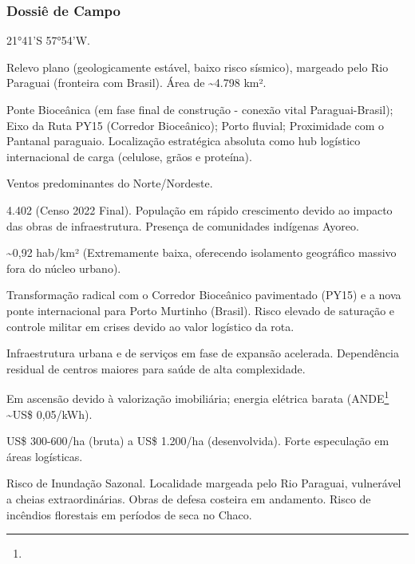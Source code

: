 \subsubsection{Dossiê de Campo}
\begin{description}[style=nextline,leftmargin=0.5cm,font=\bfseries]
\item[Coordenadas]  21°41'S 57°54'W.
\item[Topografia]  Relevo plano (geologicamente estável, baixo risco sísmico), margeado pelo Rio Paraguai (fronteira com Brasil). Área de \textasciitilde 4.798 km².
\item[Alvos Estratégicos]  Ponte Bioceânica (em fase final de construção - conexão vital Paraguai-Brasil); Eixo da Ruta PY15 (Corredor Bioceânico); Porto fluvial; Proximidade com o Pantanal paraguaio. Localização estratégica absoluta como hub logístico internacional de carga (celulose, grãos e proteína).
\item[Fallout]  Ventos predominantes do Norte/\allowbreak \allowbreak Nordeste.
\item[População]  4.402 (Censo 2022 Final). População em rápido crescimento devido ao impacto das obras de infraestrutura. Presença de comunidades indígenas Ayoreo.
\item[Densidade]  \textasciitilde 0,92 hab/\allowbreak \allowbreak km² (Extremamente baixa, oferecendo isolamento geográfico massivo fora do núcleo urbano).
\item[Vias de Acesso]  Transformação radical com o Corredor Bioceânico pavimentado (PY15) e a nova ponte internacional para Porto Murtinho (Brasil). Risco elevado de saturação e controle militar em crises devido ao valor logístico da rota.
\item[Serviços]  Infraestrutura urbana e de serviços em fase de expansão acelerada. Dependência residual de centros maiores para saúde de alta complexidade.
\item[Custo de Vida]  Em ascensão devido à valorização imobiliária; energia elétrica barata (ANDE\footnote{\fineANDE} \textasciitilde US\$ 0,05/\allowbreak \allowbreak kWh).
\item[Preço da Terra]  US\$ 300-600/\allowbreak \allowbreak ha (bruta) a US\$ 1.200/\allowbreak \allowbreak ha (desenvolvida). Forte especulação em áreas logísticas.
\item[Hidrologia]  Risco de Inundação Sazonal. Localidade margeada pelo Rio Paraguai, vulnerável a cheias extraordinárias. Obras de defesa costeira em andamento. Risco de incêndios florestais em períodos de seca no Chaco.

\end{description}
